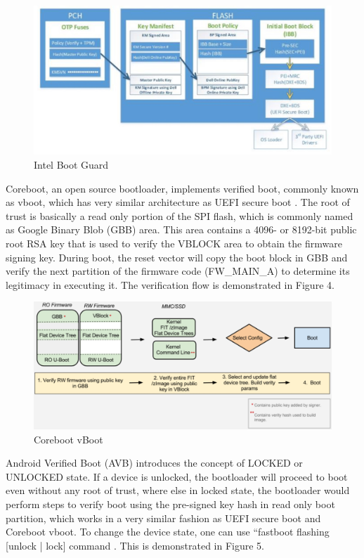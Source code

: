 \documentclass[review]{elsarticle}
\begin{document}
\begin{figure}[H]
	\centering
	\includegraphics[width=1\textwidth]{figs/IntelBootGuard.JPG}
	\caption{Intel Boot Guard \cite{R5:14}}
\end{figure}


Coreboot, an open source bootloader, implements verified boot, commonly known as vboot, which has very similar architecture as UEFI secure boot \cite{R5:16}. The root of trust is basically a read only portion of the SPI flash, which is commonly named as Google Binary Blob (GBB) area. This area contains a 4096- or 8192-bit public root RSA key that is used to verify the VBLOCK area to obtain the firmware signing key. During boot, the reset vector will copy the boot block in GBB and verify the next partition of the firmware code (FW\_MAIN\_A) to determine its legitimacy in executing it. The verification flow is demonstrated in Figure 4.
 

\begin{figure}[H]
	\centering
	\includegraphics[width=1\textwidth]{figs/CorebootVboot.JPG}
	\caption{Coreboot vBoot \cite{R5:16}}
\end{figure}

Android Verified Boot (AVB) introduces the concept of LOCKED or UNLOCKED state. If a device is unlocked, the bootloader will proceed to boot even without any root of trust, where else in locked state, the bootloader would perform steps to verify boot using the pre-signed key hash in read only boot partition, which works in a very similar fashion as UEFI secure boot and Coreboot vboot. To change the device state, one can use “fastboot flashing [unlock | lock] command \cite{R5:17}. This is demonstrated in Figure 5.
\end{document}
